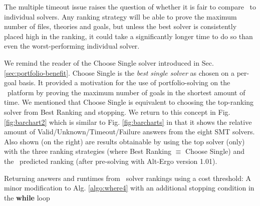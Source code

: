 The multiple timeout issue raises the question of whether it is fair to compare \where~to individual solvers. 
Any ranking strategy will be able to prove the maximum number of files, theories and goals, but unless the best solver is consistently placed high in the ranking, it could take a significantly longer time to do so than even the worst-performing individual solver.   

We remind the reader of the \textsf{Choose Single} solver introduced in Sec. \ref{sec:portfolio-benefit}.
\textsf{Choose Single} is the \textit{best single solver} as chosen on a per-goal basis.
It provided a motivation for the use of portfolio-solving on the \why~platform by proving the maximum number of goals in the shortest amount of time.
We mentioned that \textsf{Choose Single} is equivalent to choosing  the top-ranking solver from \textsf{Best Ranking} and stopping.
We return to this concept in Fig. \ref{fig:barchart2} which is similar to Fig. \ref{fig:barcharts} in that it shows the relative amount of Valid/Unknown/Timeout/Failure answers from the eight SMT solvers. 
Also shown (on the right) are results obtainable by using the top solver (only) with the three ranking strategies (where \textsf{Best Ranking} $\equiv$ \textsf{Choose Single}) and the \where~predicted ranking (after pre-solving with Alt-Ergo version 1.01).


\begin{algorithm}
	\caption{Returning answers and runtimes from \where~solver rankings using a cost threshold: A minor modification to Alg. \ref{algo:where4} with an additional stopping condition in the \textbf{while} loop}
	\label{algo:threshold}
	
\end{algorithm}

